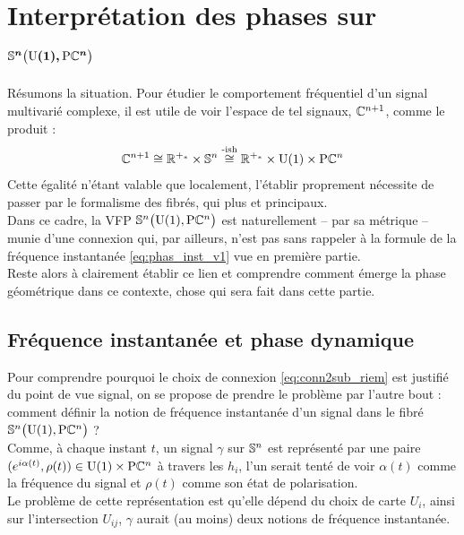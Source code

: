 \section{\wip Interprétation des phases sur $\bf{\VFP}$} \label{sec:phases_dans_VFP}

Résumons la situation. Pour étudier le comportement fréquentiel d'un signal multivarié complexe, il est utile de voir l'espace de tel signaux, $\C^{n+1}$, comme le produit :
\[\C^{n+1} \cong \R^{+_*} \times \S{n} \overset{\text{-ish}}{\cong} \R^{+_*} \times \U{1} \times \PC{n}\]
Cette égalité n'étant valable que localement, l'établir proprement nécessite de passer par le formalisme des fibrés, qui plus et principaux.
\\
Dans ce cadre, la VFP $\VFP$ est naturellement -- par sa métrique -- munie d'une connexion qui, par ailleurs, n'est pas sans rappeler à la formule de la fréquence instantanée \eqref{eq:phas_inst_v1} vue en première partie.
\\
Reste alors à clairement établir ce lien et comprendre comment émerge la phase géométrique dans ce contexte, chose qui sera fait dans cette partie.
\\



\subsection{Fréquence instantanée et phase dynamique}


Pour comprendre pourquoi le choix de connexion \eqref{eq:conn2sub_riem} est justifié du point de vue signal, on se propose de prendre le problème par l'autre bout : comment définir la notion de fréquence instantanée d'un signal dans le fibré $\VFP$ ?
\\
 
Comme, à chaque instant $t$, un signal $\gamma$ sur $\S{n}$ est représenté par une paire $(e^{i\alpha(t)}, \rho(t))\in\U{1}\times\PC{n}$ à travers les $h_i$,  l'un serait tenté de voir $\alpha(t)$ comme la fréquence du signal et $\rho(t)$ comme son état de polarisation.
\\
Le problème de cette représentation est qu'elle dépend du choix de carte $U_i$, ainsi sur l'intersection $U_{ij}$, $\gamma$ aurait (au moins) deux notions de fréquence instantanée.
\\

